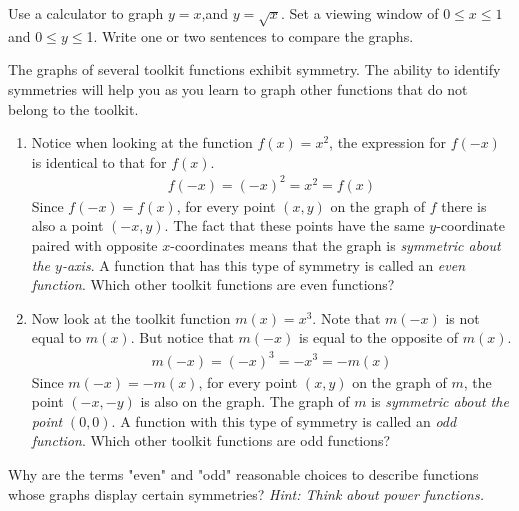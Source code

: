 \documentclass[10pt,]{book}
\theoremstyle{ptxdefinitionnotitle}
\theoremstyle{ptxdefinitiontitle}
\numberwithin{equation}{section}
\begin{document}
\begin{divisionexercise}{6}\hypertarget{exercise-16}{}
\hypertarget{p-66}{}%
Use a calculator to graph \(y=x\),and \(y=\sqrt{x}\). Set a viewing window of \(0 \leq x \leq 1\) and \(0 \leq y \leq \)1.  Write one or two sentences to compare the graphs.%
\end{divisionexercise}%
\begin{divisionexercise}{7}\hypertarget{exercise-17}{}
\hypertarget{p-67}{}%
The graphs of several toolkit functions exhibit symmetry. The ability to identify symmetries will help you as you learn to graph other functions that do not belong to the toolkit. \leavevmode%
\begin{enumerate}[label=(\alph*)]
\item\hypertarget{li-60}{}\hypertarget{p-68}{}%
Notice when looking at the function \(f(x) = x^2\), the expression for \(f(-x)\) is identical to that for \(f(x)\).%
\begin{gather*}
f(-x) = \left( -x \right)^2 = x^2 = f(x)
\end{gather*}
Since \(f(-x) = f(x)\), for every point \(\left( x, y \right)\) on the graph of \(f\) there is also a point \(\left(-x, y \right)\). The fact that these points have the same \(y\)-coordinate paired with opposite \(x\)-coordinates means that the graph is \emph{symmetric about the \(y\)-axis}. A function that has this type of symmetry is called an \emph{even function}.  Which other toolkit functions are even functions?%
\item\hypertarget{li-61}{}\hypertarget{p-69}{}%
Now look at the toolkit function \(m(x) = x^3\). Note that \(m(-x)\) is not equal to \(m(x)\). But notice that \(m(-x)\) is equal to the opposite of \(m(x)\).%
\begin{gather*}
m(-x) = \left( -x \right)^3 = -x^3 = -m(x)
\end{gather*}
Since \(m(-x) = -m(x)\), for every point \(\left( x, y \right)\) on the graph of \(m\), the point \(\left( -x, -y \right)\) is also on the graph. The graph of \(m\) is \emph{symmetric about the point} \(\left( 0, 0 \right)\). A function with this type of symmetry is called an \emph{odd function}.  Which other toolkit functions are odd functions?%
\end{enumerate}
%
\end{divisionexercise}%
\begin{divisionexercise}{8}\hypertarget{exercise-18}{}
\hypertarget{p-70}{}%
Why are the terms "even" and "odd" reasonable choices to describe functions whose graphs display certain symmetries? \emph{Hint: Think about power functions.}%
\end{divisionexercise}%
\end{document}
